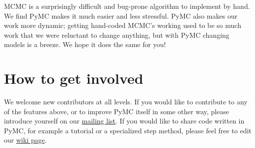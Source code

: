 
MCMC is a surprisingly difficult and bug-prone algorithm to implement by hand. We find PyMC makes it much easier and less stressful. PyMC also makes our work more dynamic; getting hand-coded MCMC's working used to be so much work that we were reluctant to change anything, but with PyMC changing models is a breeze. We hope it does the same for you!

% 

\section{How to get involved} %

We welcome new contributors at all levels. If you would like to contribute to any of the features above, or to improve PyMC itself in some other way, please introduce yourself on our \href{pymc@googlegroups.com}{mailing list}. If you would like to share code written in PyMC, for example a tutorial or a specialized step method, please feel free to edit our \href{http://code.google.com/p/pymc/w/list}{wiki page}.
